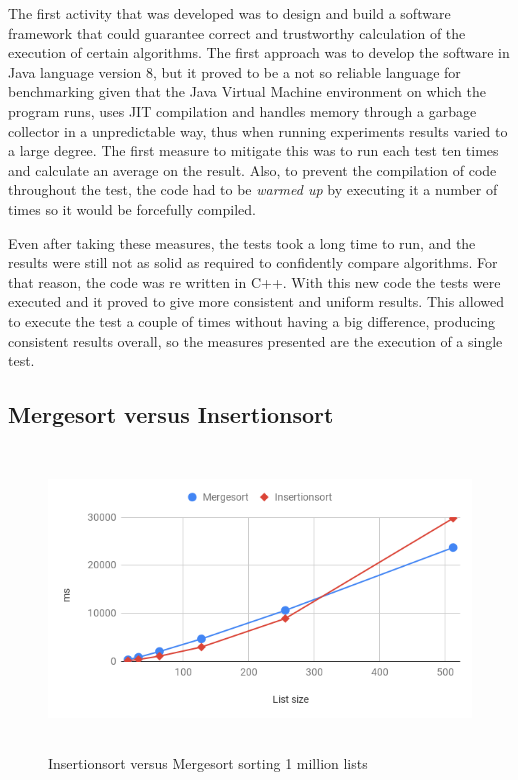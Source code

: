 \documentclass[a4paper,12pt]{article}
\begin{document}
The first activity that was developed was to design and build a software framework that could guarantee correct and trustworthy calculation of the execution of certain algorithms. The first approach was to develop the software in Java language version 8, but it proved to be a not so reliable language for benchmarking given that the Java Virtual Machine environment on which the program runs, uses JIT  compilation and handles memory through a garbage collector in a unpredictable way, thus when running experiments results varied to a large degree. The first measure to mitigate this was to run each test ten times and calculate an average on the result. Also, to prevent the compilation of code throughout the test, the code had to be {\it warmed up} by executing it a number of times so it would be forcefully compiled. 

Even after taking these measures, the tests took a long time to run, and the results were still not as solid as required to confidently compare algorithms. For that reason, the code was re written in C++. With this new code the tests were  executed and it proved to give more consistent and uniform results. This allowed to execute the test a couple of times without having a big difference, producing consistent results overall, so the measures presented are the execution of a single test.

\subsection{Mergesort versus Insertionsort} \label{InsrtVsMerge}

\begin{figure}[H]
    \centering
     \includegraphics[height=8cm,keepaspectratio]{./images/InsertionvsMerge.png}
    \caption{Insertionsort versus Mergesort sorting 1 million lists}
    \label{fig:InsrtVsMerge}
\end{figure}
\end{document}
